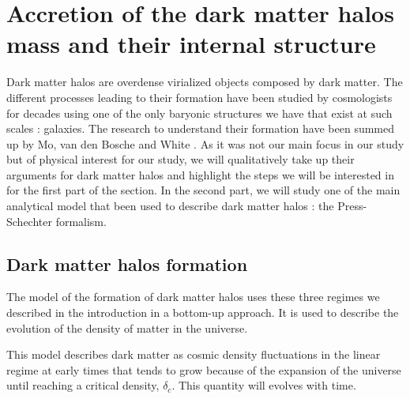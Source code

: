 


\newpage
\section{Accretion of the dark matter halos mass and their internal structure}
\label{Section I}


Dark matter halos are overdense virialized objects composed by dark matter. The different processes leading to their formation have been studied by cosmologists for decades using one of the only baryonic structures we have that exist at such scales : galaxies. The research to understand their formation have been summed up by Mo, van den Bosche and White \cite{MBW}. As it was not our main focus in our study but of physical interest for our study, we will qualitatively take up their arguments for dark matter halos and highlight the steps we will be interested in for the first part of the section. In the second part, we will study one of the main analytical model that been used to describe dark matter halos : the Press-Schechter formalism.


\subsection{Dark matter halos formation}

The model of the formation of dark matter halos uses these three regimes we described in the introduction in a bottom-up approach. It is used to describe the evolution of the density of matter in the universe.

This model describes dark matter as cosmic density fluctuations in the linear regime at early times that tends to grow because of the expansion of the universe until reaching a critical density, $\delta_c$. This quantity will evolves with time. 

